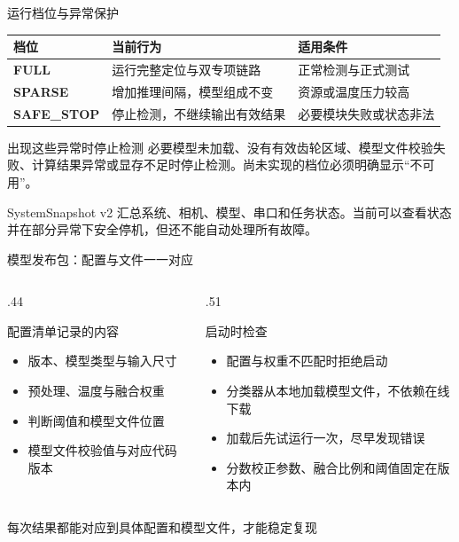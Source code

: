 \documentclass[aspectratio=169,10pt]{beamer}
\begin{document}
\begin{frame}{运行档位与异常保护}
  \renewcommand{\arraystretch}{1.25}
  \begin{tabularx}{\linewidth}{>{\bfseries}l X X}
    \toprule
    档位 & 当前行为 & 适用条件 \\
    \midrule
    FULL & 运行完整定位与双专项链路 & 正常检测与正式测试 \\
    SPARSE & 增加推理间隔，模型组成不变 & 资源或温度压力较高 \\
    SAFE\_STOP & 停止检测，不继续输出有效结果 & 必要模块失败或状态非法 \\
    \bottomrule
  \end{tabularx}

  \vspace{1em}
  \begin{block}{出现这些异常时停止检测}
    必要模型未加载、没有有效齿轮区域、模型文件校验失败、计算结果异常或显存不足时停止检测。尚未实现的档位必须明确显示“不可用”。
  \end{block}

  \vfill
  SystemSnapshot v2 汇总系统、相机、模型、串口和任务状态。当前可以查看状态并在部分异常下安全停机，但还不能自动处理所有故障。
\end{frame}

\begin{frame}{模型发布包：配置与文件一一对应}
  \begin{columns}[T,onlytextwidth]
    \begin{column}{.44\textwidth}
      \begin{block}{配置清单记录的内容}
        \begin{itemize}
          \item 版本、模型类型与输入尺寸
          \item 预处理、温度与融合权重
          \item 判断阈值和模型文件位置
          \item 模型文件校验值与对应代码版本
        \end{itemize}
      \end{block}
    \end{column}
    \begin{column}{.51\textwidth}
      \begin{exampleblock}{启动时检查}
        \begin{itemize}
          \item 配置与权重不匹配时拒绝启动
          \item 分类器从本地加载模型文件，不依赖在线下载
          \item 加载后先试运行一次，尽早发现错误
          \item 分数校正参数、融合比例和阈值固定在版本内
        \end{itemize}
      \end{exampleblock}
    \end{column}
  \end{columns}

  \vfill
  \centering
  \textcolor{seugreen}{\large 每次结果都能对应到具体配置和模型文件，才能稳定复现}
\end{frame}
\end{document}
